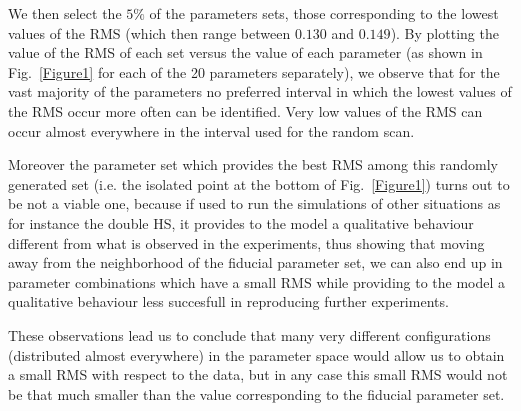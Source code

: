 \documentclass[oneside, 10pt, a4paper, twocolumn]{article}
\begin{document}

We then select the $5\%$ of the parameters sets, those corresponding to the lowest values of the RMS (which then range between $0.130$ and $0.149$). 
By plotting the value of the RMS of each set versus the value of each parameter (as shown in Fig.~\ref{Figure1} for each of the 20 parameters separately), we observe that for the vast majority of the parameters no preferred interval in which the lowest values of the RMS occur more often can be identified. Very low values of the RMS can occur almost everywhere in the interval used for the random scan. 


Moreover the parameter set which provides the best RMS among this randomly generated set (i.e. the isolated point at the bottom of Fig.~\ref{Figure1}) turns out to be not a viable one, because if used to run the simulations of other situations as for instance the double HS, it provides to the model a qualitative behaviour different from what is observed in the experiments, thus showing that moving away from the neighborhood of the fiducial parameter set, we can also end up in parameter combinations which have a small RMS while providing to the model a qualitative behaviour less succesfull in reproducing further experiments.

These observations lead us to conclude that many very different configurations (distributed almost everywhere) in the parameter space would allow us to obtain a small RMS with respect to the data, but in any case this small RMS would not be that much smaller than the value corresponding to the fiducial parameter set.
\end{document}
